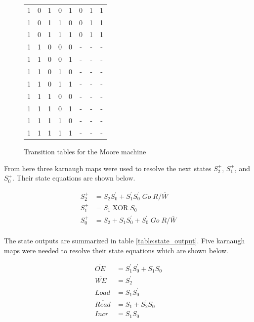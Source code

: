 \documentclass[11pt]{article}
\begin{document}
\begin{figure}[htpb]
{\begin{tabular}{c c c c c | c c c}
			1 & 0 & 1 & 0 & 1 & 0 & 1 & 1 \\
			1 & 0 & 1 & 1 & 0 & 0 & 1 & 1 \\
			1 & 0 & 1 & 1 & 1 & 0 & 1 & 1 \\
			1 & 1 & 0 & 0 & 0 & - & - & - \\
			1 & 1 & 0 & 0 & 1 & - & - & - \\
			1 & 1 & 0 & 1 & 0 & - & - & - \\
			1 & 1 & 0 & 1 & 1 & - & - & - \\
			1 & 1 & 1 & 0 & 0 & - & - & - \\
			1 & 1 & 1 & 0 & 1 & - & - & - \\
			1 & 1 & 1 & 1 & 0 & - & - & - \\
			1 & 1 & 1 & 1 & 1 & - & - & - \\
		\end{tabular}
	}
	\caption[figurename=Table]{Transition tables for the Moore machine}
	\label{table:transition-moore}
\end{figure}


From here three karnaugh maps were used to resolve the next states $S_2^+$, $S_1^+$, and $S_0^+$. Their state equations are shown below.

\begin{align*}
	S_2^+ &= S_2 S_0^{\prime} + S_1^{\prime} S_0^{\prime}\; Go\; R/\overline{W}\\
	S_1^+ &= S_1\; \text{XOR}\; S_0 \\
	S_0^+ &= S_2 + S_1 S_0^{\prime} + S_0^{\prime}\; Go\; R/\overline{W} \\
\end{align*}

\newpage

The state outputs are summarized in table \ref{table:state_output}. Five karnaugh maps were needed to resolve their state equations which are shown below.

\begin{align*}
	\overline{OE} &= S_1^{\prime} S_0^{\prime} + S_1 S_0 \\
	\overline{WE} &= S_2^{\prime} \\
	Load &= S_1 S_0^{\prime} \\
	\overline{Read} &= S_1 + S_2^{\prime} S_0 \\
	Incr &= S_1 S_0 \\
\end{align*}
\end{document}
